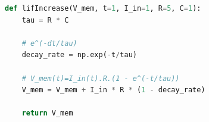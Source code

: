 \begin{lstlisting}[language=Python, caption={
		Python implementation of the increasing action potential behavior of a LIF:
		\textbf{V\_mem}: Membrane potential at the current time step;
		\textbf{t=1}: simulation time step;
		\textbf{R=5}: membrane resistance;
		\textbf{C=1}: membrane capacitance;
		\textbf{tau = R * C}: membrane time constant (i.e., the characteristic decay time of the membrane potential);
		\textbf{decay\_rate=-t/tau}: The rate by which the membrane voltage decays for each time step.
	}, label={lst:membranepotentialincrease}]
def lifIncrease(V_mem, t=1, I_in=1, R=5, C=1):    
	tau = R * C
	
	# e^(-dt/tau)
	decay_rate = np.exp(-t/tau)
	
	# V_mem(t)=I_in(t).R.(1 - e^(-t/tau))
	V_mem = V_mem + I_in * R * (1 - decay_rate)
	
	return V_mem
\end{lstlisting}